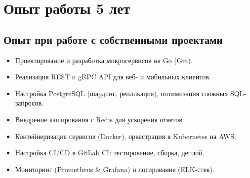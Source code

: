\documentclass[a4paper,11pt]{article}
\begin{document}
\section*{Опыт работы 5 лет}

\subsection*{Опыт при работе с собственными проектами}
\begin{itemize}[leftmargin=*]
    \item Проектирование и разработка микросервисов на Go (Gin).
    \item Реализация REST и gRPC API для веб- и мобильных клиентов.
    \item Настройка PostgreSQL (шардинг, репликация), оптимизация сложных SQL-запросов.
    \item Внедрение кэширования с Redis для ускорения ответов.
    \item Контейнеризация сервисов (Docker), оркестрация в Kubernetes на AWS.
    \item Настройка CI/CD в GitLab CI: тестирование, сборка, деплой.
    \item Мониторинг (Prometheus \& Grafana) и логирование (ELK-стек).
\end{itemize}
\end{document}
